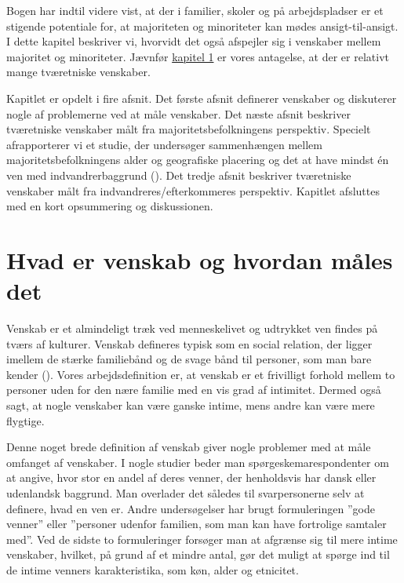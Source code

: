 \documentclass[
]{book}
\begin{document}
\newpage

Bogen har indtil videre vist, at der i familier, skoler og på arbejdspladser er et stigende potentiale for, at majoriteten og minoriteter kan mødes ansigt-til-ansigt. I dette kapitel beskriver vi, hvorvidt det også afspejler sig i venskaber mellem majoritet og minoriteter. Jævnfør \hyperref[kap1]{kapitel 1} er vores antagelse, at der er relativt mange tværetniske venskaber.

Kapitlet er opdelt i fire afsnit. Det første afsnit definerer venskaber og diskuterer nogle af problemerne ved at måle venskaber. Det næste afsnit beskriver tværetniske venskaber målt fra majoritetsbefolkningens perspektiv. Specielt afrapporterer vi et studie, der undersøger sammenhængen mellem majoritetsbefolkningens alder og geografiske placering og det at have mindst én ven med indvandrerbaggrund (). Det tredje afsnit beskriver tværetniske venskaber målt fra indvandreres/efterkommeres perspektiv. Kapitlet afsluttes med en kort opsummering og diskussionen.

\section{Hvad er venskab og hvordan måles det}\label{hvad-er-venskab-og-hvordan-muxe5les-det}

Venskab er et almindeligt træk ved menneskelivet og udtrykket ven findes på tværs af kulturer. Venskab defineres typisk som en social relation, der ligger imellem de stærke familiebånd og de svage bånd til personer, som man bare kender (). Vores arbejdsdefinition er, at venskab er et frivilligt forhold mellem to personer uden for den nære familie med en vis grad af intimitet. Dermed også sagt, at nogle venskaber kan være ganske intime, mens andre kan være mere flygtige.

Denne noget brede definition af venskab giver nogle problemer med at måle omfanget af venskaber. I nogle studier beder man spørgeskemarespondenter om at angive, hvor stor en andel af deres venner, der henholdsvis har dansk eller udenlandsk baggrund. Man overlader det således til svarpersonerne selv at definere, hvad en ven er. Andre undersøgelser har brugt formuleringen ''gode venner'' eller ''personer udenfor familien, som man kan have fortrolige samtaler med''. Ved de sidste to formuleringer forsøger man at afgrænse sig til mere intime venskaber, hvilket, på grund af et mindre antal, gør det muligt at spørge ind til de intime venners karakteristika, som køn, alder og etnicitet.
\end{document}
